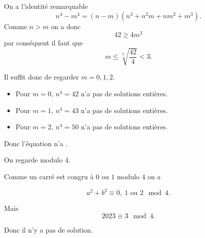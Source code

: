 \begin{sol}
  On a l'identité remarquable
  \[n^4 - m^4 = (n-m)(n^3+n^2 m + n m^2 + m^3).\]
  Comme $n > m$ on a donc
  \[42 \geq 4m^3\]
  par conséquent il faut que
  \[m \leq \sqrt[3]{\frac{42}{4}} < 3.\]

  Il suffit donc de regarder $m = 0,1,2$.

  \begin{itemize}
    \item Pour $m=0$, $n^4 = 42$ n'a pas de solutions entières.
    \item Pour $m=1$, $n^4 = 43$ n'a pas de solutions entières.
    \item Pour $m=2$, $n^4 = 50$ n'a pas de solutions entières.
  \end{itemize}

  Donc l'équation n'a .
\end{sol}

\begin{sol}
  On regarde modulo $4$.

  Comme un carré est congru à $0$ ou $1$ modulo $4$ on a

  \[a^2 + b^2 \equiv 0,~1 \text{ ou } 2 \mod 4.\]

  Mais \[2023 \equiv 3 \mod 4.\]

  Donc il n'y a pas de solution.
\end{sol}

